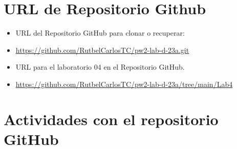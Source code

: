 \documentclass{article}
\begin{document}
\section{URL de Repositorio Github}
\begin{itemize}
	\item URL del Repositorio GitHub para clonar o recuperar:
	\item \url{https://github.com/RutbelCarlosTC/pw2-lab-d-23a.git}
	\item URL para el laboratorio 04 en el Repositorio GitHub.
	\item \url{https://github.com/RutbelCarlosTC/pw2-lab-d-23a/tree/main/Lab4}
\end{itemize}

\section{Actividades con el repositorio GitHub}
\end{document}
